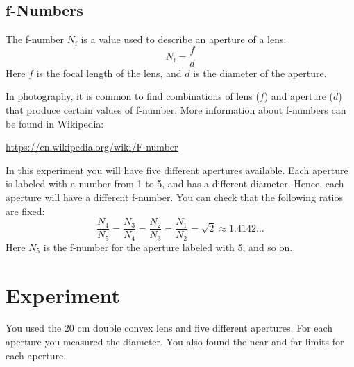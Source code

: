 \subsection{f-Numbers}
%
The f-number $N_{\text{f}}$ is a value used to describe an aperture of a lens:
\begin{equation}
    N_{\text{f}} = \frac{f}{d}
\end{equation}
Here $f$ is the focal length of the lens, and $d$ is the diameter of the aperture.

In photography, it is common to find combinations of lens ($f$) and aperture ($d$) that produce certain values of f-number. More information about f-numbers can be found in Wikipedia:
\begin{center}
    \url{https://en.wikipedia.org/wiki/F-number}
\end{center}
In this experiment you will have five different apertures available. Each aperture is labeled with a number from 1 to 5, and has a different diameter. Hence, each aperture will have a different f-number. You can check that the following ratios are fixed:
\begin{equation}
    \frac{N_{4}}{N_{5}} = \frac{N_{3}}{N_{4}} = \frac{N_{2}}{N_{3}} = \frac{N_{1}}{N_{2}} = \sqrt{2} \approx 1.4142\ldots
\end{equation}
Here $N_{5}$ is the f-number for the aperture labeled with 5, and so on.
%
\section{Experiment}
%
You used the 20 cm double convex lens and five different apertures. For each aperture you measured the diameter. You also found the near and far limits for each aperture.
%
